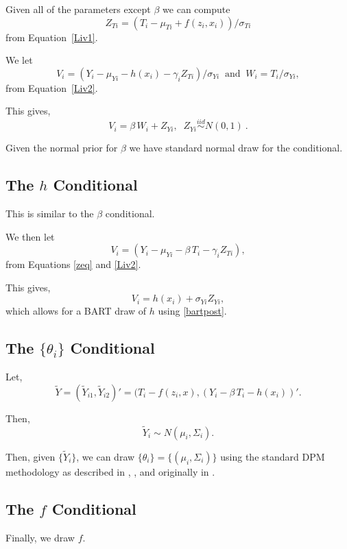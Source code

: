Given all of the parameters except $\beta$ we can compute
\begin{equation}\label{zeq}
Z_{Ti} = (T_i - \mu_{Ti} + f(z_i,x_i))/\sigma_{Ti}
\end{equation}
from Equation~\ref{Liv1}.

We let
$$
V_i = (Y_i - \mu_{Yi} - h(x_i) - \gamma_i Z_{Ti})/\sigma_{Yi} \;\;  \mbox{and} \;\; W_i = T_i/\sigma_{Yi},
$$
from Equation~\ref{Liv2}.

This gives,
$$
V_i = \beta \, W_i + Z_{Yi}, \;\; Z_{Yi} 
\stackrel{\scriptstyle iid}{\sim} N(0,1)\ .
$$

Given the normal prior for $\beta$ we have standard normal draw for the conditional.


\subsection{The $h$ Conditional}\label{hcond}

This is similar to the $\beta$ conditional.

We then let
$$
V_i = (Y_i - \mu_{Yi} - \beta \, T_i - \gamma_i Z_{Ti}),
$$
from Equations \ref{zeq} and \ref{Liv2}.

This gives,
$$
V_i = h(x_i) + \sigma_{Yi} Z_{Yi},
$$
which allows for a BART draw of $h$ using \ref{bartpost}.

\subsection{The $\{\theta_i\}$ Conditional}\label{tcond}

Let,
\begin{equation}\label{tcond}
\tilde{Y} = (\tilde{Y}_{i1}, \tilde{Y}_{i2})' = (T_i - f(z_i,x), (Y_i - \beta \, T_i - h(x_i))'.
\end{equation}

Then,
$$
\tilde{Y}_i \sim N(\mu_i,\Sigma_i).
$$

Then, given $\{\tilde{Y}_i\}$, we can draw $\{\theta_i\} = \{(\mu_i,\Sigma_i)\}$ using the standard DPM 
methodology as described in \cite{ROSSI14}, \cite{CHMR08}, 
and originally in \cite{EW95}. 

\subsection{The $f$ Conditional}\label{fcond}

Finally, we draw $f$.


